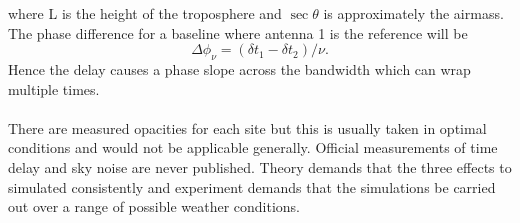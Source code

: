 where L is the height of the troposphere and $\sec\theta$ is approximately the airmass. The phase difference for a baseline where antenna 1 is the reference will be
\begin{equation}
\Delta \phi_\nu = (\delta t_1 - \delta t_2)/\nu.
\end{equation}
Hence the delay causes a phase slope across the bandwidth which can wrap multiple times. \\
~\\
There are measured opacities for each site but this is usually taken in optimal conditions and would not be applicable generally. Official measurements of time delay and sky noise are never published. Theory demands that the three effects to simulated consistently and experiment demands that the simulations be carried out over a range of possible weather conditions. 


